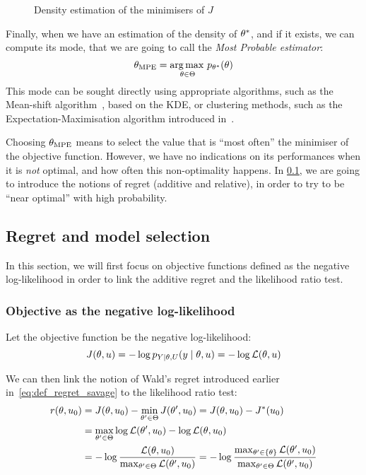 \documentclass[../../Main_ManuscritThese.tex]{subfiles}
\newcommand\imgpath{/home/victor/acadwriting/Manuscrit/Text/Chapter3/img/}
\begin{document}
\begin{figure}[ht]
  \centering
  
  \caption{\label{fig:theta_star_samples} Density estimation of the minimisers of $J$}
\end{figure}

Finally, when we have an estimation of the density of $\theta^*$, and if it exists, we can compute its mode, that we are going to call the \emph{Most Probable estimator}:
\begin{equation}
  {\theta}_{\mathrm{MPE}} = \operatorname*{arg\,max \,}_{\theta \in \Theta} p_{\theta^*}(\theta)
\end{equation}
This mode can be sought directly using appropriate algorithms, such as the Mean-shift algorithm~\citep{yizong_cheng_mean_1995}, based on the KDE, or clustering methods, such as the Expectation-Maximisation algorithm introduced in~\cite{dempster_maximum_1977}.

Choosing ${\theta}_{\mathrm{MPE}}$ means to select the value that is
``most often'' the minimiser of the objective function. However, we
have no indications on its performances when it is \emph{not} optimal,
and how often this non-optimality happens.  In \cref{sec:regret}, we
are going to introduce the notions of regret (additive and relative),
in order to try to be ``near optimal'' with high probability.


\subsection{Regret and model selection}
\label{sec:regret}
In this section, we will first focus on objective functions defined as
the negative log-likelihood in order to link the additive regret and
the likelihood ratio test.
\subsubsection{Objective as the negative log-likelihood}

Let the objective function be the negative log-likelihood:
\begin{equation}
  J(\theta, u) = - \log p_{Y\mid \theta, U}(y \mid \theta, u) = -\log \mathcal{L}(\theta,u)
\end{equation}

We can then link the notion of Wald's regret introduced earlier in~\cref{eq:def_regret_savage} to the likelihood ratio test:
  \begin{align}
    r(\theta,u_0) &= J(\theta, u_0) - \min_{\theta^{\prime}\in\Theta}J(\theta^{\prime}, u_0) = J(\theta,u_0) - J^*(u_0)  \\
                 &= \max_{\theta^{\prime}\in\Theta} \log \mathcal{L}(\theta^{\prime}, u_0) - \log \mathcal{L}(\theta, u_0) \\
                 &= -\log \frac{\mathcal{L}(\theta, u_0)}{\max_{\theta^{\prime}\in\Theta}\mathcal{L}(\theta^{\prime}, u_0)} = -\log \frac{\max_{\theta^{\prime}\in\{\theta\}}\mathcal{L}(\theta^{\prime}, u_0)}{\max_{\theta^{\prime}\in\Theta}\mathcal{L}(\theta^{\prime}, u_0)}
  \end{align}
\end{document}
